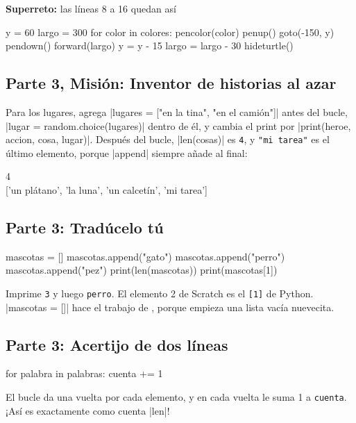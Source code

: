 \textbf{Superreto:} las líneas 8 a 16 quedan así
\begin{codenonum}
y = 60
largo = 300
for color in colores:
    pencolor(color)
    penup()
    goto(-150, y)
    pendown()
    forward(largo)
    y = y - 15
    largo = largo - 30
hideturtle()
\end{codenonum}

\subsection*{Parte 3, Misión: Inventor de historias al azar}
Para los lugares, agrega \py|lugares = ["en la tina", "en el camión"]| antes del bucle, \py|lugar = random.choice(lugares)| dentro de él, y cambia el print por \py|print(heroe, accion, cosa, lugar)|. Después del bucle, \py|len(cosas)| es \texttt{4}, y \texttt{"mi tarea"} es el último elemento, porque \py|append| siempre añade al final:
\begin{outputbox}
4\\
{[}'un plátano', 'la luna', 'un calcetín', 'mi tarea']
\end{outputbox}

\subsection*{Parte 3: Tradúcelo tú}
\begin{codenonum}
mascotas = []
mascotas.append("gato")
mascotas.append("perro")
mascotas.append("pez")
print(len(mascotas))
print(mascotas[1])
\end{codenonum}
Imprime \texttt{3} y luego \texttt{perro}. El elemento 2 de Scratch es el \texttt{[1]} de Python. \py|mascotas = []| hace el trabajo de , porque empieza una lista vacía nuevecita.

\subsection*{Parte 3: Acertijo de dos líneas}
\begin{codenonum}
for palabra in palabras:
    cuenta += 1
\end{codenonum}
El bucle da una vuelta por cada elemento, y en cada vuelta le suma 1 a \texttt{cuenta}. ¡Así es exactamente como cuenta \py|len|!
